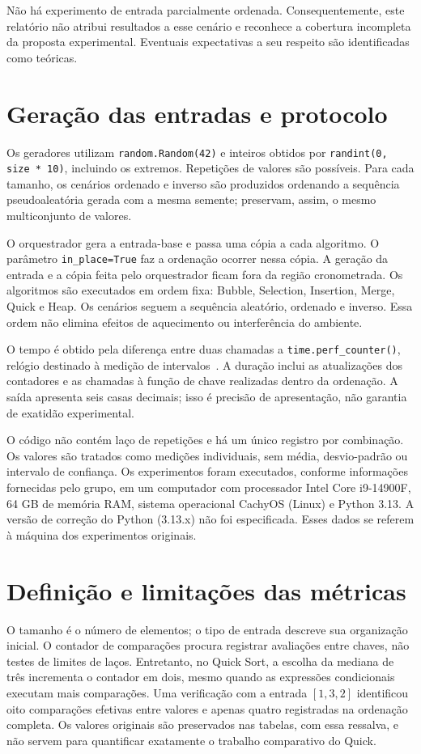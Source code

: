 \documentclass[12pt]{uftex}
\begin{document}
Não há experimento de entrada parcialmente ordenada. Consequentemente, este relatório não atribui resultados a esse cenário e reconhece a cobertura incompleta da proposta experimental. Eventuais expectativas a seu respeito são identificadas como teóricas.

\section{Geração das entradas e protocolo}
Os geradores utilizam \texttt{random.Random(42)} e inteiros obtidos por \texttt{randint(0, size * 10)}, incluindo os extremos. Repetições de valores são possíveis. Para cada tamanho, os cenários ordenado e inverso são produzidos ordenando a sequência pseudoaleatória gerada com a mesma semente; preservam, assim, o mesmo multiconjunto de valores.

O orquestrador gera a entrada-base e passa uma cópia a cada algoritmo. O parâmetro \texttt{in\_place=True} faz a ordenação ocorrer nessa cópia. A geração da entrada e a cópia feita pelo orquestrador ficam fora da região cronometrada. Os algoritmos são executados em ordem fixa: Bubble, Selection, Insertion, Merge, Quick e Heap. Os cenários seguem a sequência aleatório, ordenado e inverso. Essa ordem não elimina efeitos de aquecimento ou interferência do ambiente.

O tempo é obtido pela diferença entre duas chamadas a \texttt{time.perf\_counter()}, relógio destinado à medição de intervalos~\cite{python-time}. A duração inclui as atualizações dos contadores e as chamadas à função de chave realizadas dentro da ordenação. A saída apresenta seis casas decimais; isso é precisão de apresentação, não garantia de exatidão experimental.

O código não contém laço de repetições e há um único registro por combinação. Os valores são tratados como medições individuais, sem média, desvio-padrão ou intervalo de confiança. Os experimentos foram executados, conforme informações fornecidas pelo grupo, em um computador com processador Intel Core i9-14900F, 64 GB de memória RAM, sistema operacional CachyOS (Linux) e Python 3.13. A versão de correção do Python (3.13.x) não foi especificada. Esses dados se referem à máquina dos experimentos originais.

\section{Definição e limitações das métricas}\label{sec:metricas}
O tamanho é o número de elementos; o tipo de entrada descreve sua organização inicial. O contador de comparações procura registrar avaliações entre chaves, não testes de limites de laços. Entretanto, no Quick Sort, a escolha da mediana de três incrementa o contador em dois, mesmo quando as expressões condicionais executam mais comparações. Uma verificação com a entrada $[1,3,2]$ identificou oito comparações efetivas entre valores e apenas quatro registradas na ordenação completa. Os valores originais são preservados nas tabelas, com essa ressalva, e não servem para quantificar exatamente o trabalho comparativo do Quick.
\end{document}

